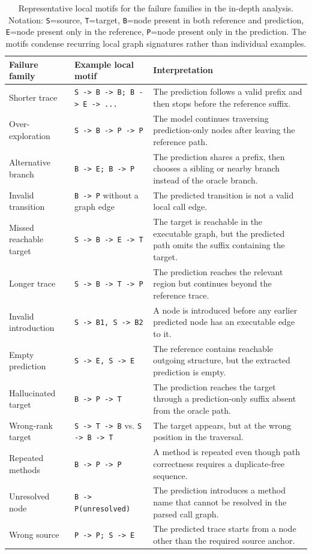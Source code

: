 \begin{table}[t]
    \centering
    \caption{Representative local motifs for the failure families in the in-depth analysis. Notation: \texttt{S}=source, \texttt{T}=target, \texttt{B}=node present in both reference and prediction, \texttt{E}=node present only in the reference, \texttt{P}=node present only in the prediction. The motifs condense recurring local graph signatures rather than individual examples.}
    \label{tab:local-motif-examples}
    \small
    \begin{tabularx}{\textwidth}{p{}p{}X}
        \toprule
        Failure family & Example local motif & Interpretation \\
        \midrule
        Shorter trace & \texttt{S -> B -> B; B -> E -> ...} & The prediction follows a valid prefix and then stops before the reference suffix. \\
        Over-exploration & \texttt{S -> B -> P -> P} & The model continues traversing prediction-only nodes after leaving the reference path. \\
        Alternative branch & \texttt{B -> E; B -> P} & The prediction shares a prefix, then chooses a sibling or nearby branch instead of the oracle branch. \\
        Invalid transition & \texttt{B -> P} without a graph edge & The predicted transition is not a valid local call edge. \\
        Missed reachable target & \texttt{S -> B -> E -> T} & The target is reachable in the executable graph, but the predicted path omits the suffix containing the target. \\
        Longer trace & \texttt{S -> B -> T -> P} & The prediction reaches the relevant region but continues beyond the reference trace. \\
        Invalid introduction & \texttt{S -> B1, S -> B2} & A node is introduced before any earlier predicted node has an executable edge to it. \\
        Empty prediction & \texttt{S -> E, S -> E} & The reference contains reachable outgoing structure, but the extracted prediction is empty. \\
        Hallucinated target & \texttt{B -> P -> T} & The prediction reaches the target through a prediction-only suffix absent from the oracle path. \\
        Wrong-rank target & \texttt{S -> T -> B} vs. \texttt{S -> B -> T} & The target appears, but at the wrong position in the traversal. \\
        Repeated methods & \texttt{B -> P -> P} & A method is repeated even though path correctness requires a duplicate-free sequence. \\
        Unresolved node & \texttt{B -> P(unresolved)} & The prediction introduces a method name that cannot be resolved in the parsed call graph. \\
        Wrong source & \texttt{P -> P; S -> E} & The predicted trace starts from a node other than the required source anchor. \\
        \bottomrule
    \end{tabularx}
\end{table}
